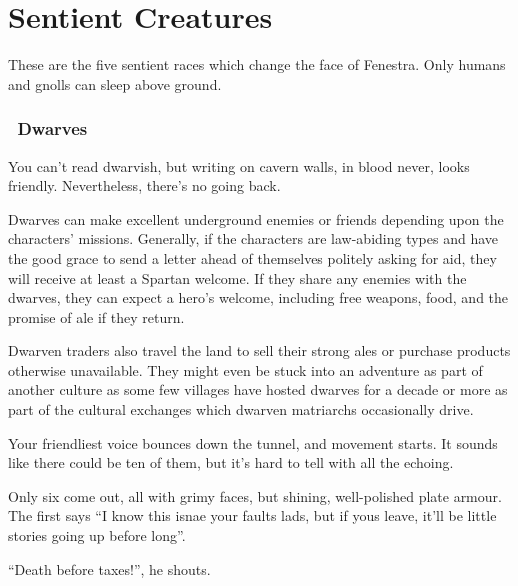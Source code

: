 \chapter{Sentient Creatures}
\toggletrue{genExamples}

\noindent
These are the five sentient races which change the face of Fenestra.
Only humans and gnolls can sleep above ground.

\begin{multicols}{2}

\subsection[Dwarves]{\Dw\ Dwarves}
\label{best_dwarves}

\begin{boxtext}

  You can't read dwarvish, but writing on cavern walls, in blood never, looks friendly.
  Nevertheless, there's no going back.

\end{boxtext}

Dwarves can make excellent underground enemies or friends depending upon the characters' missions.
Generally, if the characters are law-abiding types and have the good grace to send a letter ahead of themselves politely asking for aid, they will receive at least a Spartan welcome.
If they share any enemies with the dwarves, they can expect a hero's welcome, including free weapons, food, and the promise of ale if they return.

Dwarven traders also travel the land to sell their strong ales or purchase products otherwise unavailable.
They might even be stuck into an adventure as part of another culture as some few villages have hosted dwarves for a decade or more as part of the cultural exchanges which dwarven matriarchs occasionally drive.

\begin{boxtext}

  Your friendliest voice bounces down the tunnel, and movement starts.
  It sounds like there could be ten of them, but it's hard to tell with all the echoing.

  Only six come out, all with grimy faces, but shining, well-polished plate armour.
  The first says ``I know this isnae your faults lads, but if yous leave, it'll be little stories going up before long''.

  ``Death before taxes!'', he shouts.


\end{boxtext}
\end{multicols}
